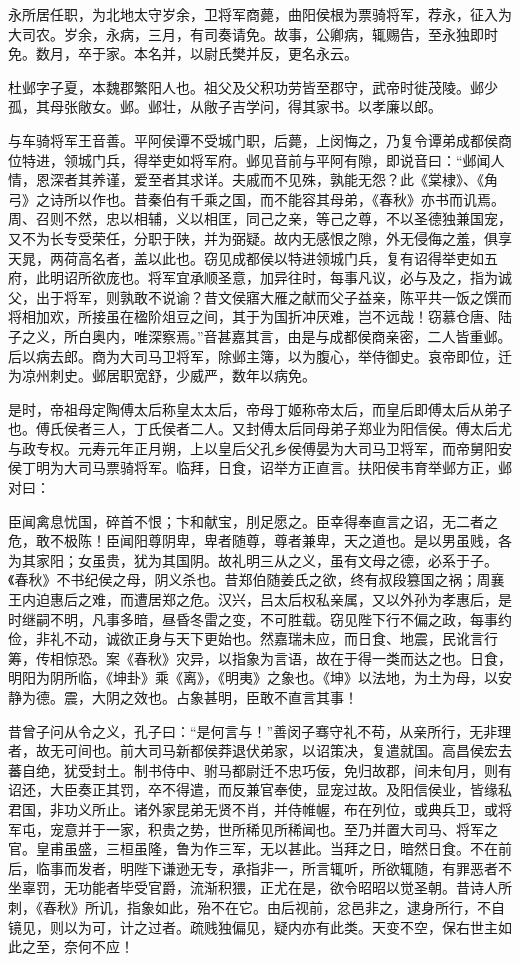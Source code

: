 \documentclass[]{article}
\begin{document}
永所居任职，为北地太守岁余，卫将军商薨，曲阳侯根为票骑将军，荐永，征入为大司农。岁余，永病，三月，有司奏请免。故事，公卿病，辄赐告，至永独即时免。数月，卒于家。本名并，以尉氏樊并反，更名永云。

杜邺字子夏，本魏郡繁阳人也。祖父及父积功劳皆至郡守，武帝时徙茂陵。邺少孤，其母张敞女。邺。邺壮，从敞子吉学问，得其家书。以孝廉以郎。

与车骑将军王音善。平阿侯谭不受城门职，后薨，上闵悔之，乃复令谭弟成都侯商位特进，领城门兵，得举吏如将军府。邺见音前与平阿有隙，即说音曰：``邺闻人情，恩深者其养谨，爱至者其求详。夫戚而不见殊，孰能无怨？此《棠棣》、《角弓》之诗所以作也。昔秦伯有千乘之国，而不能容其母弟，《春秋》亦书而讥焉。周、召则不然，忠以相辅，义以相匡，同己之亲，等己之尊，不以圣德独兼国宠，又不为长专受荣任，分职于陕，并为弼疑。故内无感恨之隙，外无侵侮之羞，俱享天晁，两荷高名者，盖以此也。窃见成都侯以特进领城门兵，复有诏得举吏如五府，此明诏所欲庞也。将军宜承顺圣意，加异往时，每事凡议，必与及之，指为诚父，出于将军，则孰敢不说谕？昔文侯寤大雁之献而父子益亲，陈平共一饭之馔而将相加欢，所接虽在楹阶俎豆之间，其于为国折冲厌难，岂不远哉！窃慕仓唐、陆子之义，所白奥内，唯深察焉。''音甚嘉其言，由是与成都侯商亲密，二人皆重邺。后以病去郎。商为大司马卫将军，除邺主簿，以为腹心，举侍御史。哀帝即位，迁为凉州刺史。邺居职宽舒，少威严，数年以病免。

是时，帝祖母定陶傅太后称皇太太后，帝母丁姬称帝太后，而皇后即傅太后从弟子也。傅氏侯者三人，丁氏侯者二人。又封傅太后同母弟子郑业为阳信侯。傅太后尤与政专权。元寿元年正月朔，上以皇后父孔乡侯傅晏为大司马卫将军，而帝舅阳安侯丁明为大司马票骑将军。临拜，日食，诏举方正直言。扶阳侯韦育举邺方正，邺对曰：

臣闻禽息忧国，碎首不恨；卞和献宝，刖足愿之。臣幸得奉直言之诏，无二者之危，敢不极陈！臣闻阳尊阴卑，卑者随尊，尊者兼卑，天之道也。是以男虽贱，各为其家阳；女虽贵，犹为其国阴。故礼明三从之义，虽有文母之德，必系于子。《春秋》不书纪侯之母，阴义杀也。昔郑伯随姜氏之欲，终有叔段篡国之祸；周襄王内迫惠后之难，而遭居郑之危。汉兴，吕太后权私亲属，又以外孙为孝惠后，是时继嗣不明，凡事多暗，昼昏冬雷之变，不可胜载。窃见陛下行不偏之政，每事约俭，非礼不动，诚欲正身与天下更始也。然嘉瑞未应，而日食、地震，民讹言行筹，传相惊恐。案《春秋》灾异，以指象为言语，故在于得一类而达之也。日食，明阳为阴所临，《坤卦》乘《离》，《明夷》之象也。《坤》以法地，为土为母，以安静为德。震，大阴之效也。占象甚明，臣敢不直言其事！

昔曾子问从令之义，孔子曰：``是何言与！''善闵子骞守礼不苟，从亲所行，无非理者，故无可间也。前大司马新都侯莽退伏弟家，以诏策决，复遣就国。高昌侯宏去蕃自绝，犹受封土。制书侍中、驸马都尉迁不忠巧佞，免归故郡，间未旬月，则有诏还，大臣奏正其罚，卒不得遣，而反兼官奉使，显宠过故。及阳信侯业，皆缘私君国，非功义所止。诸外家昆弟无贤不肖，并侍帷幄，布在列位，或典兵卫，或将军屯，宠意并于一家，积贵之势，世所稀见所稀闻也。至乃并置大司马、将军之官。皇甫虽盛，三桓虽隆，鲁为作三军，无以甚此。当拜之日，暗然日食。不在前后，临事而发者，明陛下谦逊无专，承指非一，所言辄听，所欲辄随，有罪恶者不坐辜罚，无功能者毕受官爵，流渐积猥，正尤在是，欲令昭昭以觉圣朝。昔诗人所刺，《春秋》所讥，指象如此，殆不在它。由后视前，忿邑非之，逮身所行，不自镜见，则以为可，计之过者。疏贱独偏见，疑内亦有此类。天变不空，保右世主如此之至，奈何不应！
\end{document}
